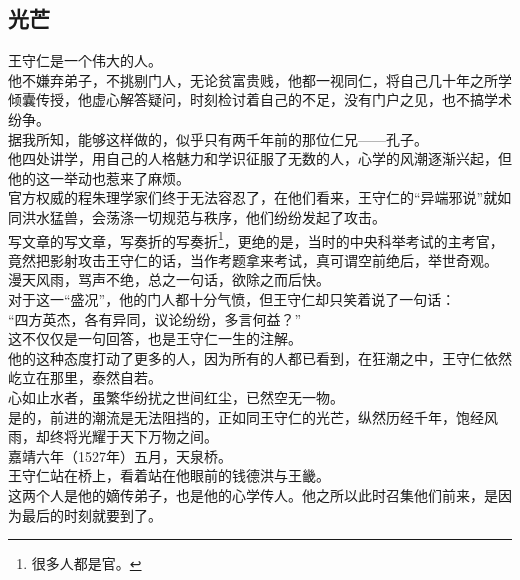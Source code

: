 \begin{multicols}{\theparacolNo}
\subsection{光芒}
王守仁是一个伟大的人。\\

他不嫌弃弟子，不挑剔门人，无论贫富贵贱，他都一视同仁，将自己几十年之所学倾囊传授，他虚心解答疑问，时刻检讨着自己的不足，没有门户之见，也不搞学术纷争。\\

据我所知，能够这样做的，似乎只有两千年前的那位仁兄——孔子。\\

他四处讲学，用自己的人格魅力和学识征服了无数的人，心学的风潮逐渐兴起，但他的这一举动也惹来了麻烦。\\

官方权威的程朱理学家们终于无法容忍了，在他们看来，王守仁的“异端邪说”就如同洪水猛兽，会荡涤一切规范与秩序，他们纷纷发起了攻击。\\

写文章的写文章，写奏折的写奏折\footnote{很多人都是官。}，更绝的是，当时的中央科举考试的主考官，竟然把影射攻击王守仁的话，当作考题拿来考试，真可谓空前绝后，举世奇观。\\

漫天风雨，骂声不绝，总之一句话，欲除之而后快。\\

对于这一“盛况”，他的门人都十分气愤，但王守仁却只笑着说了一句话：\\

“四方英杰，各有异同，议论纷纷，多言何益？”\\

这不仅仅是一句回答，也是王守仁一生的注解。\\

他的这种态度打动了更多的人，因为所有的人都已看到，在狂潮之中，王守仁依然屹立在那里，泰然自若。\\

心如止水者，虽繁华纷扰之世间红尘，已然空无一物。\\

是的，前进的潮流是无法阻挡的，正如同王守仁的光芒，纵然历经千年，饱经风雨，却终将光耀于天下万物之间。\\

嘉靖六年（1527年）五月，天泉桥。\\

王守仁站在桥上，看着站在他眼前的钱德洪与王畿。\\

这两个人是他的嫡传弟子，也是他的心学传人。他之所以此时召集他们前来，是因为最后的时刻就要到了。\\


\end{multicols}

